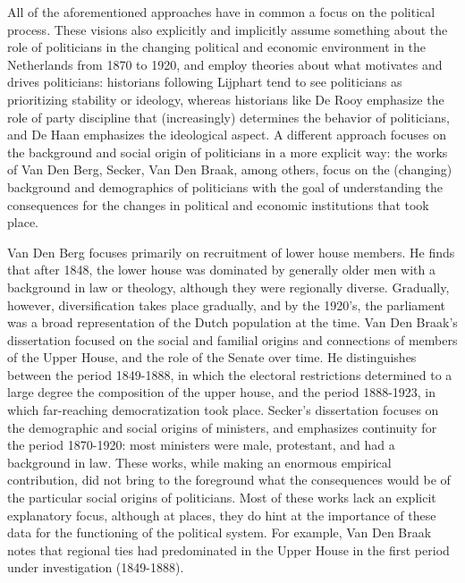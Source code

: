     All of the aforementioned approaches have in common a focus on the political process. These visions also explicitly and implicitly assume something about the role of politicians in the changing political and economic environment in the Netherlands from 1870 to 1920, and employ theories about what motivates and drives politicians: historians following Lijphart tend to see politicians as prioritizing stability or ideology, whereas historians like De Rooy emphasize the role of party discipline that (increasingly) determines the behavior of politicians, and De Haan emphasizes the ideological aspect. A different approach focuses on the background and social origin of politicians in a more explicit way: the works of Van Den Berg, Secker, Van Den Braak, among others, focus on the (changing) background and demographics of politicians with the goal of understanding the consequences for the changes in political and economic institutions that took place. \autocite{van1983toegang, secker1991ministers, van1999eerste}
    
    Van Den Berg focuses primarily on recruitment of lower house members.\autocite{van1983toegang} He finds that after 1848, the lower house was dominated by generally older men with a background in law or theology, although they were regionally diverse. Gradually, however, diversification takes place gradually, and by the 1920's, the parliament was a broad representation of the Dutch population at the time. Van Den Braak’s dissertation focused on the social and familial origins and connections of members of the Upper House, and the role of the Senate over time.\autocite{van1999eerste} He distinguishes between the period 1849-1888, in which the electoral restrictions determined to a large degree the composition of the upper house, and the period 1888-1923, in which far-reaching democratization took place. Secker’s dissertation focuses on the demographic and social origins of ministers, and emphasizes continuity for the period 1870-1920: most ministers were male, protestant, and had a background in law. \autocite{secker1991ministers} These works, while making an enormous empirical contribution, did not bring to the foreground what the consequences would be of the particular social origins of politicians. Most of these works lack an explicit explanatory focus, although at places, they do hint at the importance of these data for the functioning of the political system. For example, Van Den Braak notes that regional ties had predominated in the Upper House in the first period under investigation (1849-1888).\autocite[p. 130]{van1999eerste} 
    
